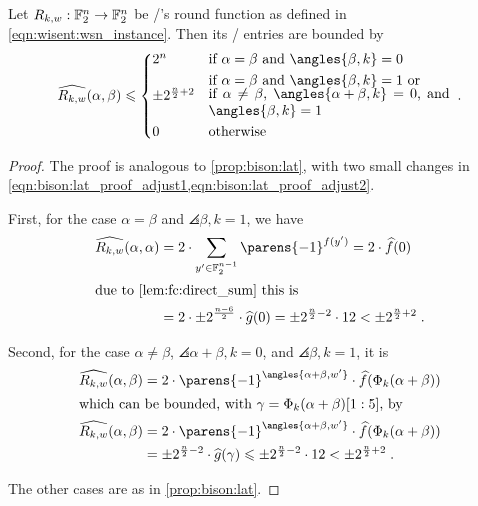\begin{proposition}
    Let $R_{k,w} : \mathbb{F}_2^n \to \mathbb{F}_2^n$ be \wisent/'s round function as defined in \cref{eqn:wisent:wsn_instance}.
    Then its \LAT/ entries are bounded by
    \begin{equation*}%
        \FC{R_{k,w}}(\alpha, \beta) \leqslant \begin{cases*}
            2^n                   & if $\alpha = \beta$ and $\angles{\beta, k} = 0$ \\
            \pm 2^{\frac{n}{2}+2} & \parbox[c]{0.5\textwidth}{%
                                        if $\alpha = \beta$ and $\angles{\beta, k} = 1$ or\\[-2.5pt]
                                        if $\alpha \neq \beta$, $\angles{\alpha + \beta, k} = 0$, and $\angles{\beta, k} = 1$
                                    }\\
            0                     & otherwise
        \end{cases*}\;.
    \end{equation*}
\end{proposition}
\begin{proof}
    The proof is analogous to \cref{prop:bison:lat}, with two small changes in \cref{eqn:bison:lat_proof_adjust1,eqn:bison:lat_proof_adjust2}.

    First, for the case $\alpha = \beta$ and $\angles{\beta, k} = 1$, we have
    \begin{align*}
        \FC{R_{k,w}}(\alpha, \alpha)
        &= 2 \cdot \sum_{y^\prime \in \F_2^{n-1}}\parens{-1}^{f(y^\prime)} = 2 \cdot \FC{f}(0) \\
        \intertext{due to \cref{lem:fc:direct_sum} this is}
        &= 2 \cdot \pm 2^{\frac{n-6}{2}} \cdot \FC{g}(0) = \pm 2^{\frac{n}{2}-2} \cdot 12 < \pm 2^{\frac{n}{2}+2}\;.
    \end{align*}

    Second, for the case $\alpha \neq \beta$, $\angles{\alpha + \beta, k} = 0$, and $\angles{\beta, k} = 1$, it is
    \begin{align*}
        \FC{R_{k,w}}(\alpha, \beta)
        &= 2 \cdot \parens{-1}^{\angles{\alpha + \beta, w^\prime}} \cdot \FC{f}(\Phi_k(\alpha + \beta)) \\
        \intertext{which can be bounded, with $\gamma = \Phi_k(\alpha + \beta)[1 : 5]$, by}
        \FC{R_{k,w}}(\alpha, \beta)
        &= 2 \cdot \parens{-1}^{\angles{\alpha + \beta, w^\prime}} \cdot \FC{f}(\Phi_k(\alpha + \beta)) \\
        &= \pm 2^{\frac{n}{2} - 2} \cdot \FC{g}(\gamma) \leqslant \pm 2^{\frac{n}{2} - 2} \cdot 12 < \pm 2^{\frac{n}{2}+2}\;.
    \end{align*}

    The other cases are as in \cref{prop:bison:lat}.
\end{proof}

